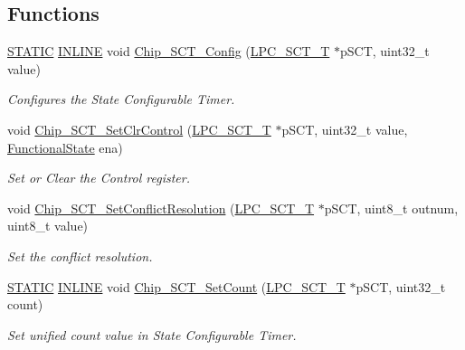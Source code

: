 \subsection*{Functions}
\begin{DoxyCompactItemize}
\item 
\hyperlink{group___l_p_c___types___public___macros_ga10b2d890d871e1489bb02b7e70d9bdfb}{S\+T\+A\+T\+IC} \hyperlink{spifi__18xx__43xx_8h_a2eb6f9e0395b47b8d5e3eeae4fe0c116}{I\+N\+L\+I\+NE} void \hyperlink{group___s_c_t__18_x_x__43_x_x_ga1c4a7a1622ec276ae01e01e8fe3ad2e6}{Chip\+\_\+\+S\+C\+T\+\_\+\+Config} (\hyperlink{struct_l_p_c___s_c_t___t}{L\+P\+C\+\_\+\+S\+C\+T\+\_\+T} $\ast$p\+S\+CT, uint32\+\_\+t value)
\begin{DoxyCompactList}\small\item\em Configures the State Configurable Timer. \end{DoxyCompactList}\item 
void \hyperlink{group___s_c_t__18_x_x__43_x_x_ga116504a56b8154a596b701496fd08ef3}{Chip\+\_\+\+S\+C\+T\+\_\+\+Set\+Clr\+Control} (\hyperlink{struct_l_p_c___s_c_t___t}{L\+P\+C\+\_\+\+S\+C\+T\+\_\+T} $\ast$p\+S\+CT, uint32\+\_\+t value, \hyperlink{group___l_p_c___types___public___types_gac9a7e9a35d2513ec15c3b537aaa4fba1}{Functional\+State} ena)
\begin{DoxyCompactList}\small\item\em Set or Clear the Control register. \end{DoxyCompactList}\item 
void \hyperlink{group___s_c_t__18_x_x__43_x_x_ga7b35d2d5a1f5c007abdcd96fb6e8dfe6}{Chip\+\_\+\+S\+C\+T\+\_\+\+Set\+Conflict\+Resolution} (\hyperlink{struct_l_p_c___s_c_t___t}{L\+P\+C\+\_\+\+S\+C\+T\+\_\+T} $\ast$p\+S\+CT, uint8\+\_\+t outnum, uint8\+\_\+t value)
\begin{DoxyCompactList}\small\item\em Set the conflict resolution. \end{DoxyCompactList}\item 
\hyperlink{group___l_p_c___types___public___macros_ga10b2d890d871e1489bb02b7e70d9bdfb}{S\+T\+A\+T\+IC} \hyperlink{spifi__18xx__43xx_8h_a2eb6f9e0395b47b8d5e3eeae4fe0c116}{I\+N\+L\+I\+NE} void \hyperlink{group___s_c_t__18_x_x__43_x_x_ga8990a3d34b196d1ed7b25f7a6068b764}{Chip\+\_\+\+S\+C\+T\+\_\+\+Set\+Count} (\hyperlink{struct_l_p_c___s_c_t___t}{L\+P\+C\+\_\+\+S\+C\+T\+\_\+T} $\ast$p\+S\+CT, uint32\+\_\+t count)
\begin{DoxyCompactList}\small\item\em Set unified count value in State Configurable Timer. \end{DoxyCompactList}\item 

\end{DoxyCompactItemize}
